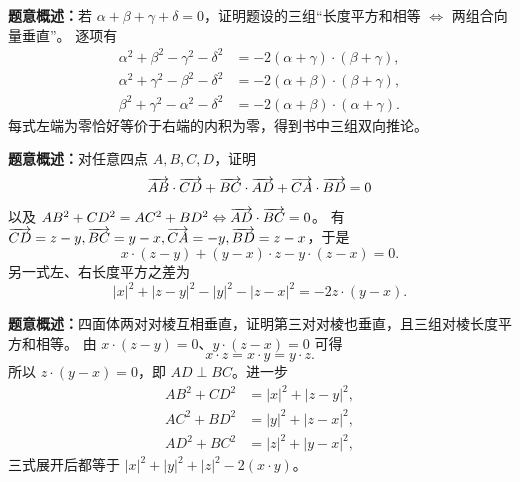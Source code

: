 \textbf{题意概述：}若 $\alpha+\beta+\gamma+\delta=0$，证明题设的三组“长度平方和相等 $\Leftrightarrow$ 两组合向量垂直”。
逐项有
\begin{align*}
\alpha^2+\beta^2-\gamma^2-\delta^2
&=-2(\alpha+\gamma)\cdot(\beta+\gamma),\\
\alpha^2+\gamma^2-\beta^2-\delta^2
&=-2(\alpha+\beta)\cdot(\beta+\gamma),\\
\beta^2+\gamma^2-\alpha^2-\delta^2
&=-2(\alpha+\beta)\cdot(\alpha+\gamma).
\end{align*}
每式左端为零恰好等价于右端的内积为零，得到书中三组双向推论。

\textbf{题意概述：}对任意四点 $A,B,C,D$，证明
\[
\overrightarrow{AB}\cdot\overrightarrow{CD}+\overrightarrow{BC}\cdot\overrightarrow{AD}+\overrightarrow{CA}\cdot\overrightarrow{BD}=0
\]
以及 $AB^2+CD^2=AC^2+BD^2\Leftrightarrow\overrightarrow{AD}\cdot\overrightarrow{BC}=0$。
有 $\overrightarrow{CD}=z-y,\overrightarrow{BC}=y-x,\overrightarrow{CA}=-y,\overrightarrow{BD}=z-x$，于是
\[
x\cdot(z-y)+(y-x)\cdot z-y\cdot(z-x)=0.
\]
另一式左、右长度平方之差为
\[
|x|^2+|z-y|^2-|y|^2-|z-x|^2=-2z\cdot(y-x).
\]

\textbf{题意概述：}四面体两对对棱互相垂直，证明第三对对棱也垂直，且三组对棱长度平方和相等。
由 $x\cdot(z-y)=0$、$y\cdot(z-x)=0$ 可得
\[
x\cdot z=x\cdot y=y\cdot z.
\]
所以 $z\cdot(y-x)=0$，即 $AD\perp BC$。进一步
\begin{align*}
AB^2+CD^2&=|x|^2+|z-y|^2,\\
AC^2+BD^2&=|y|^2+|z-x|^2,\\
AD^2+BC^2&=|z|^2+|y-x|^2,
\end{align*}
三式展开后都等于 $|x|^2+|y|^2+|z|^2-2(x\cdot y)$。
